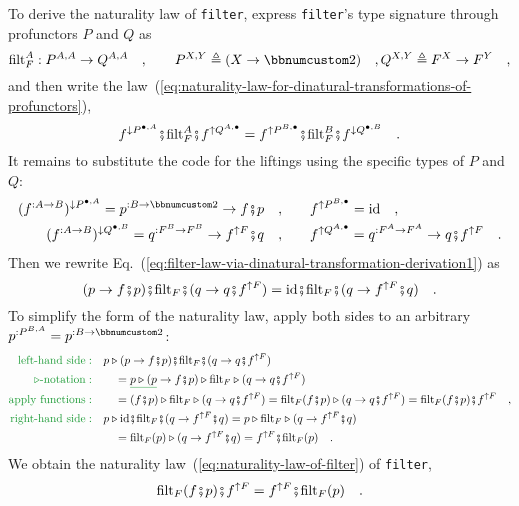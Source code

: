To derive the naturality law of \lstinline!filter!, express \lstinline!filter!'s
type signature through profunctors $P$ and $Q$ as
\[
\text{filt}_{F}^{A}:P^{A,A}\rightarrow Q^{A,A}\quad,\quad\quad P^{X,Y}\triangleq(X\rightarrow\bbnum 2)\quad,Q^{X,Y}\triangleq F^{X}\rightarrow F^{Y}\quad,
\]
and then write the law~(\ref{eq:naturality-law-for-dinatural-transformations-of-profunctors}),
\begin{equation}
f^{\downarrow P^{\bullet,A}}\bef\text{filt}_{F}^{A}\bef f^{\uparrow Q^{A,\bullet}}=f^{\uparrow P^{B,\bullet}}\bef\text{filt}_{F}^{B}\bef f^{\downarrow Q^{\bullet,B}}\quad.\label{eq:filter-law-via-dinatural-transformation-derivation1}
\end{equation}
It remains to substitute the code for the liftings using the specific
types of $P$ and $Q$:
\begin{align*}
(f^{:A\rightarrow B})^{\downarrow P^{\bullet,A}}=p^{:B\rightarrow\bbnum 2}\rightarrow f\bef p\quad, & \quad\quad f^{\uparrow P^{B,\bullet}}=\text{id}\quad,\\
(f^{:A\rightarrow B})^{\downarrow Q^{\bullet,B}}=q^{:F^{B}\rightarrow F^{B}}\rightarrow f^{\uparrow F}\bef q\quad, & \quad\quad f^{\uparrow Q^{A,\bullet}}=q^{:F^{A}\rightarrow F^{A}}\rightarrow q\bef f^{\uparrow F}\quad.
\end{align*}
Then we rewrite Eq.~(\ref{eq:filter-law-via-dinatural-transformation-derivation1})
as
\[
(p\rightarrow f\bef p)\bef\text{filt}_{F}\bef(q\rightarrow q\bef f^{\uparrow F})=\text{id}\bef\text{filt}_{F}\bef(q\rightarrow f^{\uparrow F}\bef q)\quad.
\]
To simplify the form of the naturality law, apply both sides to an
arbitrary $p^{:P^{B,A}}=p^{:B\rightarrow\bbnum 2}$:
\begin{align*}
{\color{greenunder}\text{left-hand side}:}\quad & p\triangleright(p\rightarrow f\bef p)\bef\text{filt}_{F}\bef(q\rightarrow q\bef f^{\uparrow F})\\
{\color{greenunder}\triangleright\text{-notation}:}\quad & \quad=\gunderline{p\triangleright(p}\rightarrow f\bef p)\triangleright\text{filt}_{F}\triangleright(q\rightarrow q\bef f^{\uparrow F})\\
{\color{greenunder}\text{apply functions}:}\quad & \quad=(f\bef p)\triangleright\text{filt}_{F}\triangleright(q\rightarrow q\bef f^{\uparrow F})=\text{filt}_{F}(f\bef p)\triangleright(q\rightarrow q\bef f^{\uparrow F})=\text{filt}_{F}(f\bef p)\bef f^{\uparrow F}\quad,\\
{\color{greenunder}\text{right-hand side}:}\quad & p\triangleright\text{id}\bef\text{filt}_{F}\bef(q\rightarrow f^{\uparrow F}\bef q)=p\triangleright\text{filt}_{F}\triangleright(q\rightarrow f^{\uparrow F}\bef q)\\
 & \quad=\text{filt}_{F}(p)\triangleright(q\rightarrow f^{\uparrow F}\bef q)=f^{\uparrow F}\bef\text{filt}_{F}(p)\quad.
\end{align*}
We obtain the naturality law~(\ref{eq:naturality-law-of-filter})
of \lstinline!filter!,
\[
\text{filt}_{F}(f\bef p)\bef f^{\uparrow F}=f^{\uparrow F}\bef\text{filt}_{F}(p)\quad.
\]


